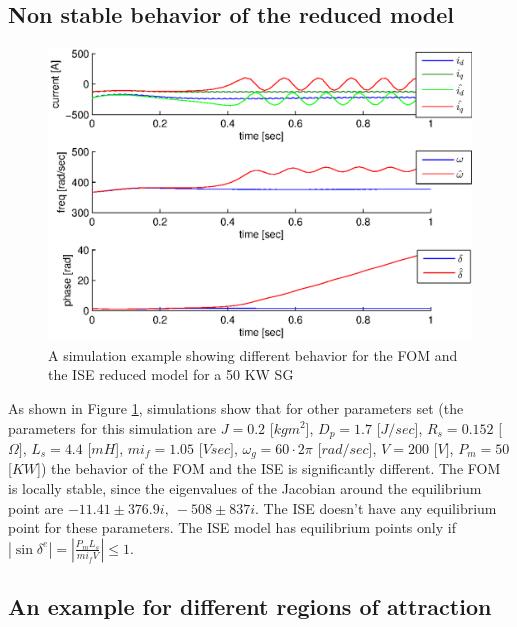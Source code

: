 \documentclass[conference]{IEEEtran}
\renewcommand{\o}    {{\omega}}
\begin{document}
\subsection{Non stable behavior of the reduced model}
\vspace{-4mm}
\begin{figure}[ht]
\includegraphics[scale=0.6]{simDiffBehavior1}

\caption{A simulation example showing different behavior for the 
         FOM and the ISE reduced model for a 50 KW SG}
\label{fig:InfBusOne1DiffBehavior1}
\end{figure}

As shown in Figure \ref{fig:InfBusOne1DiffBehavior1}, simulations show
that for other parameters set (the parameters for this simulation are
$J=0.2$ {[}$kgm^{2}${]}, $D_{p}=1.7$ {[}$J/sec${]}, $R_{s}=0.152$
{[}$\Omega]$, $L_{s}=4.4$ {[}$mH${]}, $mi_{f}=1.05$ {[}$Vsec]$,
$\o_g=60\cdotp2\pi$ {[}$rad/sec${]}, $V=200$ {[}$V]$, $P_m=50$
{[}$KW${]}) the behavior of the FOM and the ISE is significantly
different. The FOM is locally stable, since the eigenvalues of the
Jacobian around the equilibrium point are $-11.41\pm 376.9i,\ 
-508\pm 837i.$ The ISE doesn't have any equilibrium point for these
parameters. The ISE model has equilibrium points only if $ \left|
\sin\delta^e \right|= \left| \frac{P_m L_s}{mi_f V} \right| \le 1$.

\subsection{An example for different regions of attraction}
\end{document}
